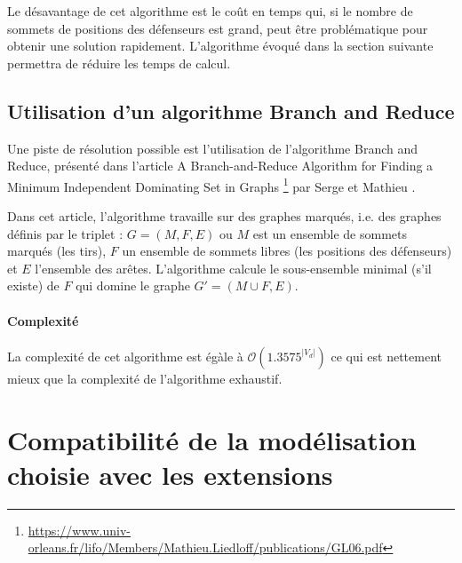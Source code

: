 \documentclass[12pt]{article}
\begin{document}
Le désavantage de cet algorithme est le coût en temps qui, si le nombre de sommets de positions des défenseurs est grand, peut être problématique pour obtenir une solution rapidement. L'algorithme évoqué dans la section suivante permettra de réduire les temps de  calcul.

\subsection{Utilisation d'un algorithme Branch and Reduce}

Une piste de résolution possible est l'utilisation de l'algorithme Branch and Reduce, présenté dans l'article \og{} A Branch-and-Reduce Algorithm for Finding a Minimum Independent Dominating Set in Graphs \fg{}\footnote{\url{https://www.univ-orleans.fr/lifo/Members/Mathieu.Liedloff/publications/GL06.pdf}} par Serge  et Mathieu .

Dans cet article, l'algorithme travaille sur des graphes marqués, i.e. des graphes définis par le triplet : $G = (M, F, E)$ ou $M$ est un ensemble de sommets marqués (les tirs), $F$ un ensemble de sommets libres (les positions des défenseurs) et $E$ l'ensemble des arêtes. L'algorithme calcule le sous-ensemble minimal (s'il existe) de $F$ qui domine le graphe $G' = (M \cup F, E)$.

\paragraph{Complexité} La complexité de cet algorithme est égàle à $\mathcal{O}(1.3575^{|V_d|})$ ce qui est nettement mieux que la complexité de l'algorithme exhaustif.






\section{Compatibilité de la modélisation choisie avec les extensions}
\end{document}
